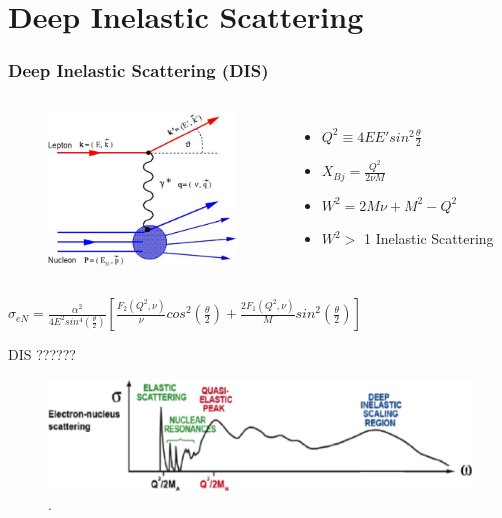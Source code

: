 \documentclass[12pt]{beamer}
\begin{document}
\section[DIS]{Deep Inelastic Scattering}
\begin{frame}
\frametitle{Deep Inelastic Scattering (DIS)}
\vspace*{-20pt}
\begin{columns}[c] %
	\begin{figure}
		\includegraphics[width =5cm]{../images/DIS.pdf}
	\end{figure}
	\begin{itemize}
		\item $ Q^2 \equiv 4EE' sin^2 \frac{\theta}{2} $
		\item $X_{Bj}= \frac{Q^2}{2\nu M}$
		\item  $W^2 = 2M\nu + M^2 - Q^2$
		\item $W^2 >$ 1 Inelastic Scattering  
	\end{itemize}
\end{columns}
	\vspace*{10pt}
	\centering
	\Large	$\sigma_{eN} = \frac{\alpha^2}{4E^2sin^4(\frac{\theta}{2})} [\frac{F_2(Q^2,\nu)}{\nu}cos^2\left(\frac{\theta}{2}\right) + \frac{2F_1(Q^2,\nu)}{M}sin^2\left(\frac{\theta}{2}\right)] $	
\end{frame}

\begin{frame}
\begin{block}{DIS ??????}
	\begin{figure}[]
		\centering
		\includegraphics[width=12cm]{../images/Thesis/E_nucleus_spect.pdf}
		\vspace{20pt}
		\caption*{ \cite{deltaIsobar}.}
		
	\end{figure}

\end{block}
\end{frame}
\end{document}
